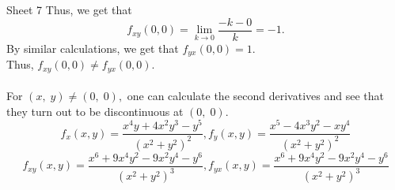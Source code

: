 \documentclass[handout, aspectratio=169]{beamer}
\begin{document}
\begin{frame}{Sheet 7}
	Thus, we get that
	\[f_{x y}(0,0)=\lim _{k \rightarrow 0} \frac{-k-0}{k}=-1.\]
	By similar calculations, we get that $f_{y x}(0,0)=1.$\\
	Thus, $f_{x y}(0,0) \neq f_{y x}(0,0).$\\~\\
	For $(x,\;y) \neq (0,\;0),$ one can calculate the second derivatives and see that they turn out to be discontinuous at $(0,\;0).$
	\[{f_{x}(x, y)=\frac{x^{4} y+4 x^{2} y^{3}-y^{5}}{\left(x^{2}+y^{2}\right)^{2}}, f_{y}(x, y)=\frac{x^{5}-4 x^{3} y^{2}-x y^{4}}{\left(x^{2}+y^{2}\right)^{2}}} \]
	\[ {f_{xy}(x,y)=\frac{x^{6}+9 x^{4} y^{2}-9 x^{2} y^{4}-y^{6}}{\left(x^{2}+y^{2}\right)^{3}},f_{yx}(x, y)=\frac{x^{6}+9 x^{4} y^{2}-9 x^{2} y^{4}-y^{6}}{\left(x^{2}+y^{2}\right)^{3}}}\]
\end{frame}
\end{document}
